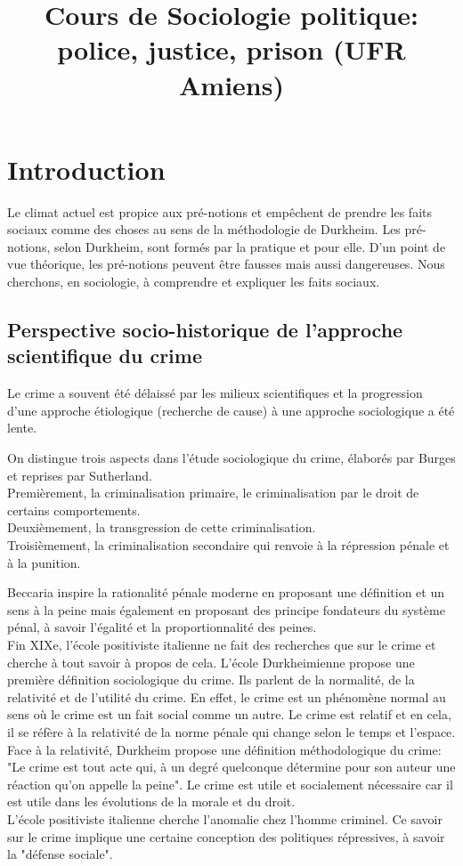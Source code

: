 \documentclass[10pt, a4paper, openany]{book}
\date{}
\title{Cours de Sociologie politique: police, justice, prison (UFR Amiens)}
\begin{document}
\maketitle
\tableofcontents

\chapter{Introduction}

Le climat actuel est propice aux pré-notions et empêchent de prendre les faits sociaux comme des choses au sens de la méthodologie de Durkheim. Les pré-notions, selon Durkheim, sont formés par la pratique et pour elle. D'un point de vue théorique, les pré-notions peuvent être fausses mais aussi dangereuses. Nous cherchons, en sociologie, à comprendre et expliquer les faits sociaux. \\

\section{Perspective socio-historique de l'approche scientifique du crime}

Le crime a souvent été délaissé par les milieux scientifiques et la progression d'une approche étiologique (recherche de cause) à une approche sociologique a été lente.  


On distingue trois aspects dans l'étude sociologique du crime, élaborés par Burges et reprises par Sutherland. \\
Premièrement, la criminalisation primaire, le criminalisation par le droit de certains comportements. \\
Deuxièmement, la transgression de cette criminalisation. \\
Troisièmement, la criminalisation secondaire qui renvoie à la répression pénale et à la punition. 


Beccaria inspire la rationalité pénale moderne en proposant une définition et un sens à la peine mais également en proposant des principe fondateurs du système pénal, à savoir l'égalité et la proportionnalité des peines. \\
Fin XIXe, l'école positiviste italienne ne fait des recherches que sur le crime et cherche à tout savoir à propos de cela. L'école Durkheimienne propose une première définition sociologique du crime. Ils parlent de la normalité, de la relativité et de l'utilité du crime. En effet, le crime est un phénomène normal au sens où le crime est un fait social comme un autre. Le crime est relatif et en cela, il se réfère à la relativité de la norme pénale qui change selon le temps et l'espace. Face à la relativité, Durkheim propose une définition méthodologique du crime: "Le crime est tout acte qui, à un degré quelconque détermine pour son auteur une réaction qu'on appelle la peine". Le crime est utile et socialement nécessaire car il est utile dans les évolutions de la morale et du droit. \\
L'école positiviste italienne cherche l'anomalie chez l'homme criminel. Ce savoir sur le crime implique une certaine conception des politiques répressives, à savoir la "défense sociale". 
\end{document}
